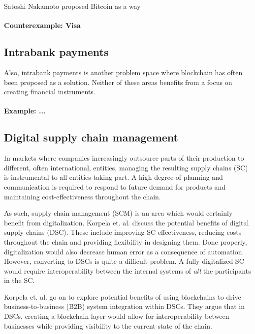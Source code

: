 Satoshi Nakamoto proposed Bitcoin as a way 

\paragraph{Counterexample: Visa}

\subsection{Intrabank payments}

Also, intrabank payments is another problem space where
blockchain has often been proposed as a solution. Neither of these
areas benefits from a focus on creating financial instruments.


\paragraph{Example: ...}

\subsection{Digital supply chain management}

In markets where companies increasingly outsource parts of their
production to different, often international, entities, managing the
resulting supply chains (SC) is instrumental to all entities taking
part. A high degree of planning and communication is required to
respond to future demand for products and maintaining
cost-effectiveness throughout the chain.

As such, supply chain management (SCM) is an area which would
certainly benefit from digitalization. Korpela et. al.
\cite{korpelaDSC} discuss the potential benefits of digital supply
chains (DSC). These include improving SC effectiveness, reducing costs
throughout the chain and providing flexibility in designing them. Done
properly, digitalization would also decrease human error as a
consequence of automation. However, converting to DSCs is quite a
difficult problem. A fully digitalized SC would require
interoperability between the internal systems of \textit{all} the
participants in the SC.

Korpela et. al. go on to explore potential benefits of using
blockchains to drive business-to-business (B2B) system integration
within DSCs. They argue that in DSCs, creating a blockchain layer
would allow for interoperability between businesses while providing
visibility to the current state of the chain.

